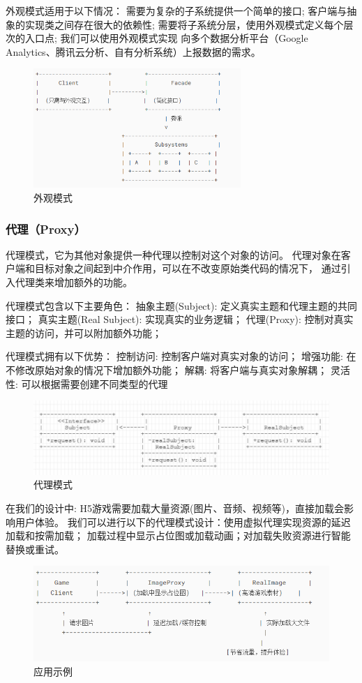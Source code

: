 \documentclass[12pt]{ctexart} %
\begin{document}
外观模式适用于以下情况：
需要为复杂的子系统提供一个简单的接口;
客户端与抽象的实现类之间存在很大的依赖性;
需要将子系统分层，使用外观模式定义每个层次的入口点;
我们可以使用外观模式实现
向多个数据分析平台（Google Analytics、腾讯云分析、自有分析系统）上报数据的需求。

\begin{figure}[H]
  \centering
  \includegraphics[width=0.7\textwidth]{waiguan.png}
  \caption{外观模式}
\end{figure}

\subsubsection{代理（Proxy）} 
代理模式，它为其他对象提供一种代理以控制对这个对象的访问。
代理对象在客户端和目标对象之间起到中介作用，可以在不改变原始类代码的情况下，
通过引入代理类来增加额外的功能。

代理模式包含以下主要角色：
抽象主题(Subject): 定义真实主题和代理主题的共同接口；
真实主题(Real Subject): 实现真实的业务逻辑；
代理(Proxy): 控制对真实主题的访问，并可以附加额外功能；

代理模式拥有以下优势：
控制访问: 控制客户端对真实对象的访问；
增强功能: 在不修改原始对象的情况下增加额外功能；
解耦: 将客户端与真实对象解耦；
灵活性: 可以根据需要创建不同类型的代理
\begin{figure}[H]
  \centering
  \includegraphics[width=1\textwidth]{daili1.png}
  \caption{代理模式}
\end{figure}

在我们的设计中: H5游戏需要加载大量资源(图片、音频、视频等)，直接加载会影响用户体验。
我们可以进行以下的代理模式设计：使用虚拟代理实现资源的延迟加载和按需加载；
加载过程中显示占位图或加载动画；对加载失败资源进行智能替换或重试。
\begin{figure}[H]
  \centering
  \includegraphics[width=1\textwidth]{daili2.png}
  \caption{应用示例}
\end{figure}
\end{document}
